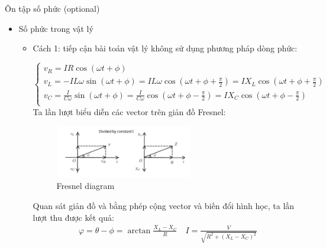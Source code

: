 \documentclass[8pt]{beamer}
\begin{document}
\begin{frame}{Ôn tập số phức (optional)}
	\begin{itemize}
		\item Số phức trong vật lý
		\begin{itemize}
				\item Cách 1: tiếp cận bài toán vật lý không sử dụng phương pháp dòng phức:

\begin{equation*}
\begin{cases}
	v_{R}=IR\cos(\omega t+\phi)\\
	v_{L}=-IL\omega\sin{(\omega t+\phi)}=IL\omega\cos{(\omega t+\phi+\frac{\pi}{2})}=IX_{L}\cos{(\omega t+\phi+\frac{\pi}{2})} \\
	v_{C}=\frac{I}{C\omega} \sin{(\omega t+\phi)}=\frac{I}{C\omega}\cos{(\omega t+\phi-\frac{\pi}{2})}=IX_{C}\cos{(\omega t+\phi-\frac{\pi}{2})} \\
\end{cases}
\end{equation*}
Ta lần lượt biểu diễn các vector trên giản đồ Fresnel:
	\begin{figure}[h]
		\includegraphics[width=0.6\textwidth]{fresnel.jpg}
		\caption{Fresnel diagram}
		\label{fig:re8}
	\end{figure}
Quan sát giản đồ và bằng phép cộng vector và biến đổi hình học, ta lần lượt thu được kết quả:
\begin{equation*}
	\begin{split}
		\varphi=\theta-\phi=\arctan{\frac{X_{L}-X_{C}}{R}} \quad I=\frac{V}{\sqrt{R^2+(X_{L}-X_{C})^2}}
	\end{split}
\end{equation*}
\end{itemize}
\end{itemize}
\end{frame}
\end{document}
